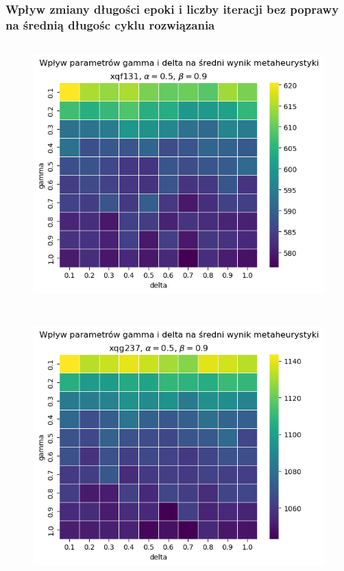 \documentclass{article}
\begin{document}
\subsubsection{Wpływ zmiany długości epoki i liczby iteracji bez poprawy na średnią długośc cyklu rozwiązania}
    \begin{figure}[h!]
        \centering
        \includegraphics[height=10.0cm]{../../plots/sa-tuning-gamma-delta-avg-xqf131.png}
    \end{figure}

    \begin{figure}[h!]
        \centering
        \includegraphics[height=10.0cm]{../../plots/sa-tuning-gamma-delta-avg-xqg237.png}
    \end{figure}
\end{document}

